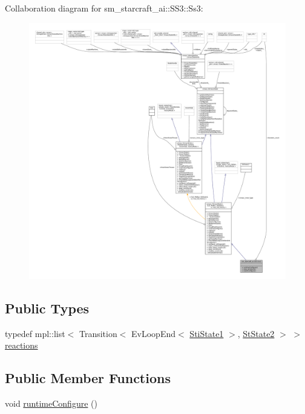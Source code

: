 Collaboration diagram for sm\+\_\+starcraft\+\_\+ai\+:\+:S\+S3\+:\+:Ss3\+:
\nopagebreak
\begin{figure}[H]
\begin{center}
\leavevmode
\includegraphics[width=350pt]{structsm__starcraft__ai_1_1SS3_1_1Ss3__coll__graph}
\end{center}
\end{figure}
\subsection*{Public Types}
\begin{DoxyCompactItemize}
\item 
typedef mpl\+::list$<$ Transition$<$ Ev\+Loop\+End$<$ \hyperlink{structsm__starcraft__ai_1_1inner__states_1_1StiState1}{Sti\+State1} $>$, \hyperlink{structsm__starcraft__ai_1_1StState2}{St\+State2} $>$ $>$ \hyperlink{structsm__starcraft__ai_1_1SS3_1_1Ss3_af5e2b5178c1100c90385485918ef0882}{reactions}
\end{DoxyCompactItemize}
\subsection*{Public Member Functions}
\begin{DoxyCompactItemize}
\item 
void \hyperlink{structsm__starcraft__ai_1_1SS3_1_1Ss3_ae78cb17dbe3a99b35f05438548dd2605}{runtime\+Configure} ()
\end{DoxyCompactItemize}
